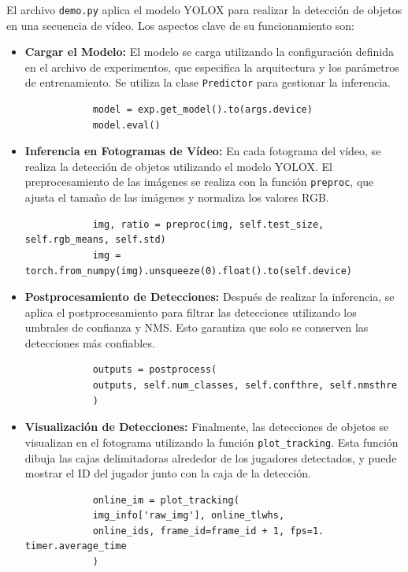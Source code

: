 \documentclass[12pt, a4paper, twoside]{article}
\begin{document}
	El archivo \texttt{demo.py} aplica el modelo YOLOX para realizar la detección de objetos en una secuencia de vídeo. Los aspectos clave de su funcionamiento son:
	
	\begin{itemize}
		\item \textbf{Cargar el Modelo:} El modelo se carga utilizando la configuración definida en el archivo de experimentos, que especifica la arquitectura y los parámetros de entrenamiento. Se utiliza la clase \texttt{Predictor} para gestionar la inferencia.
		\begin{verbatim}
			model = exp.get_model().to(args.device)
			model.eval()
		\end{verbatim}
		
		\item \textbf{Inferencia en Fotogramas de Vídeo:} En cada fotograma del vídeo, se realiza la detección de objetos utilizando el modelo YOLOX. El preprocesamiento de las imágenes se realiza con la función \texttt{preproc}, que ajusta el tamaño de las imágenes y normaliza los valores RGB.
		\begin{verbatim}
			img, ratio = preproc(img, self.test_size, self.rgb_means, self.std)
			img = torch.from_numpy(img).unsqueeze(0).float().to(self.device)
		\end{verbatim}
		
		\item \textbf{Postprocesamiento de Detecciones:} Después de realizar la inferencia, se aplica el postprocesamiento para filtrar las detecciones utilizando los umbrales de confianza y NMS. Esto garantiza que solo se conserven las detecciones más confiables.
		\begin{verbatim}
			outputs = postprocess(
			outputs, self.num_classes, self.confthre, self.nmsthre
			)
		\end{verbatim}
		
		\item \textbf{Visualización de Detecciones:} Finalmente, las detecciones de objetos se visualizan en el fotograma utilizando la función \texttt{plot\_tracking}. Esta función dibuja las cajas delimitadoras alrededor de los jugadores detectados, y puede mostrar el ID del jugador junto con la caja de la detección.
		\begin{verbatim}
			online_im = plot_tracking(
			img_info['raw_img'], online_tlwhs, 
			online_ids, frame_id=frame_id + 1, fps=1. timer.average_time
			)
		\end{verbatim}
	\end{itemize}
	
\end{document}
